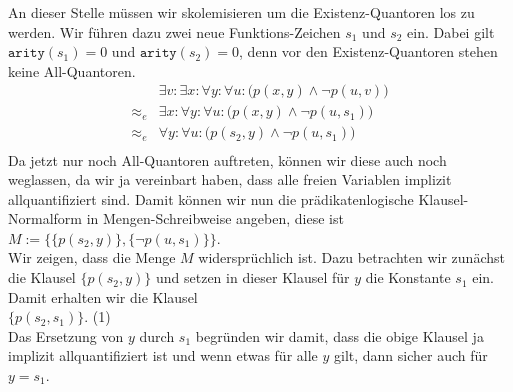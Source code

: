 An dieser Stelle müssen wir skolemisieren um die Existenz-Quantoren los zu werden. 
Wir führen dazu zwei neue Funktions-Zeichen $s_1$ und $s_2$ ein. 
Dabei gilt $\mathtt{arity}(s_1) = 0$ und $\mathtt{arity}(s_2) = 0$, denn vor den
Existenz-Quantoren stehen keine All-Quantoren.
$$
\begin{array}{ll}
           & \exists v\colon  \exists x\colon \forall y\colon \forall u\colon \Big( p(x,y) \wedge \neg p(u,v) \Big)\\
 \approx_e & \exists x\colon \forall y\colon \forall u\colon \Big( p(x,y) \wedge \neg p(u,s_1) \Big)\\
 \approx_e & \forall y\colon \forall u\colon \Big( p(s_2,y) \wedge \neg p(u,s_1) \Big)\\
\end{array}
$$
Da jetzt nur noch All-Quantoren auftreten, können wir diese auch noch weglassen,
da wir ja ver\-einbart haben, dass alle freien Variablen implizit allquantifiziert sind.
Damit können wir nun die prädikatenlogische Klausel-Normalform in Mengen-Schreibweise angeben, diese
ist
\\[0.2cm] 
\hspace*{1.3cm}
$M := \Big\{ \big\{ p(s_2,y) \big\}, \big\{\neg p(u,s_1)\big\}\Big\}$.
\\[0.2cm]
Wir zeigen, dass die Menge $M$ widersprüchlich ist.
Dazu betrachten wir zunächst die Klausel $\big\{ p(s_2,y) \big\}$ und setzen in
dieser Klausel für $y$ die Konstante $s_1$ ein.  Damit erhalten wir die Klausel \\[0.2cm]
\hspace*{1.3cm}  $\big\{ p(s_2,s_1) \big\}$. \hspace*{\fill}(1)\\[0.2cm]
Das Ersetzung von $y$ durch $s_1$ begründen wir damit, dass die obige Klausel ja implizit
allquantifiziert ist und wenn etwas für alle $y$ gilt, dann sicher auch für $y = s_1$.

